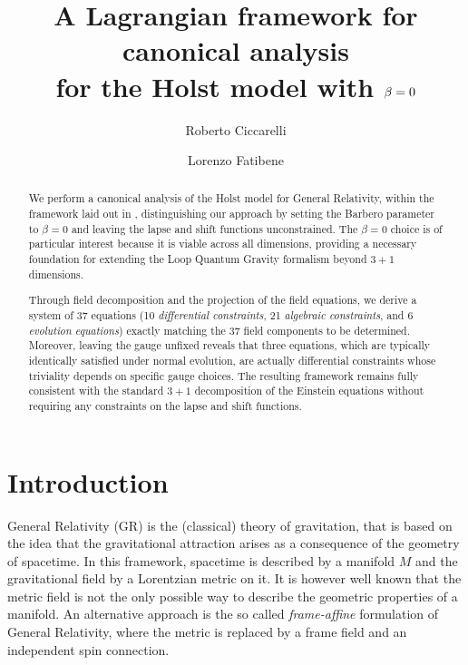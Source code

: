 \documentclass[a4paper, 11pt]{article}
\title{A Lagrangian framework for canonical analysis \\ for the Holst model with $\be = 0$}
\date{}
\author[a]{Roberto Ciccarelli}
\author[a,b]{Lorenzo Fatibene}
\affiliation[a]{Department of Mathematics {\it ``Giuseppe Peano''}, University of Torino (Italy)}
\affiliation[b]{Istituto Nazionale di Fisica Nucleare (INFN), Sezione di Torino (Italy)}
\def\be{\beta}
\numberwithin{equation}{section}
\begin{document}
\maketitle

\begin{abstract}
We perform a canonical analysis of the Holst model for General Relativity, within the framework laid out in \cite{fatibeneLectureNotes1, orizzonteBarberoImmirziConnectionsHow2021}, distinguishing our approach by setting the Barbero parameter to $\beta=0$ and leaving the lapse and shift functions unconstrained. The $\be = 0$ choice is of particular interest because it is viable across all dimensions, providing a necessary foundation for extending the Loop Quantum Gravity formalism beyond $3+1$ dimensions. 

Through field decomposition and the projection of the field equations, we derive a system of 37 equations (10 {\it differential constraints}, 21 {\it algebraic constraints}, and 6 {\it evolution equations}) exactly matching the 37 field components to be determined. Moreover, leaving the gauge unfixed reveals that three equations, which are typically identically satisfied under normal evolution, are actually differential constraints whose triviality depends on specific gauge choices. The resulting framework remains fully consistent with the standard $3+1$ decomposition of the Einstein equations without requiring any constraints on the lapse and shift functions.
\end{abstract}

\section{Introduction}
General Relativity (GR) is the (classical) theory of gravitation, that is based on the idea that the gravitational attraction arises as a consequence of the geometry of spacetime.
In this framework, spacetime is described by a manifold $M$ and  the gravitational field by a Lorentzian metric on it. It is however well known that the metric field is not the only possible way to describe the geometric properties of a manifold. An alternative approach is the so called \textit{frame-affine} formulation of General Relativity, where the metric is replaced by a frame field and an independent spin connection. 
\end{document}
